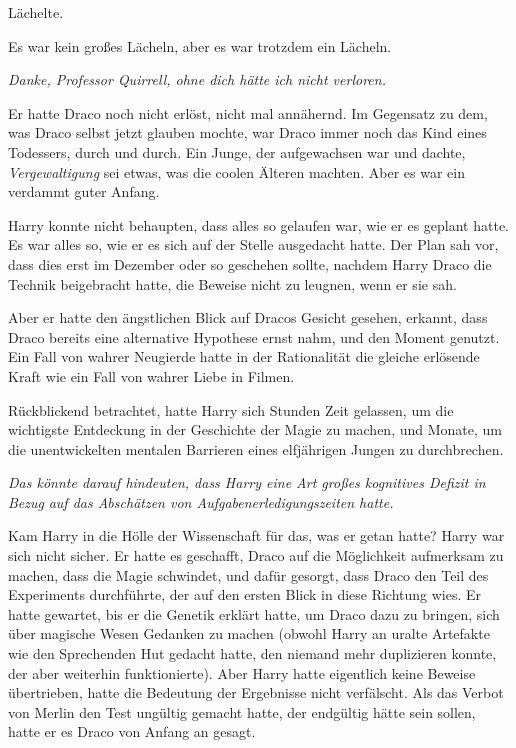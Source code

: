 Lächelte.

Es war kein großes Lächeln, aber es war trotzdem ein Lächeln.

\emph{Danke, Professor Quirrell, ohne dich hätte ich nicht verloren.}

Er hatte Draco noch nicht erlöst, nicht mal annähernd. Im Gegensatz zu dem, was
Draco selbst jetzt glauben mochte, war Draco immer noch das Kind eines
Todessers, durch und durch. Ein Junge, der aufgewachsen war und dachte, \glqq{}
\emph{Vergewaltigung}\grqq{} sei etwas, was die coolen Älteren machten. Aber es
war ein verdammt guter Anfang.

Harry konnte nicht behaupten, dass alles so gelaufen war, wie er es geplant
hatte. Es war alles so, wie er es sich auf der Stelle ausgedacht hatte. Der Plan
sah vor, dass dies erst im Dezember oder so geschehen sollte, nachdem Harry
Draco die Technik beigebracht hatte, die Beweise nicht zu leugnen, wenn er sie
sah.

Aber er hatte den ängstlichen Blick auf Dracos Gesicht gesehen, erkannt, dass
Draco bereits eine alternative Hypothese ernst nahm, und den Moment genutzt. Ein
Fall von wahrer Neugierde hatte in der Rationalität die gleiche erlösende Kraft
wie ein Fall von wahrer Liebe in Filmen.

Rückblickend betrachtet, hatte Harry sich Stunden Zeit gelassen, um die
wichtigste Entdeckung in der Geschichte der Magie zu machen, und Monate, um die
unentwickelten mentalen Barrieren eines elfjährigen Jungen zu durchbrechen.

\emph{Das könnte darauf hindeuten, dass Harry eine Art großes kognitives Defizit
in Bezug} \emph{auf das Abschätzen von Aufgabenerledigungszeiten hatte.}

Kam Harry in die Hölle der Wissenschaft für das, was er getan hatte? Harry war
sich nicht sicher. Er hatte es geschafft, Draco auf die Möglichkeit aufmerksam
zu machen, dass die Magie schwindet, und dafür gesorgt, dass Draco den Teil des
Experiments durchführte, der auf den ersten Blick in diese Richtung wies. Er
hatte gewartet, bis er die Genetik erklärt hatte, um Draco dazu zu bringen, sich
über magische Wesen Gedanken zu machen (obwohl Harry an uralte Artefakte wie den
Sprechenden Hut gedacht hatte, den niemand mehr duplizieren konnte, der aber
weiterhin funktionierte). Aber Harry hatte eigentlich keine Beweise übertrieben,
hatte die Bedeutung der Ergebnisse nicht verfälscht. Als das Verbot von Merlin
den Test ungültig gemacht hatte, der endgültig hätte sein sollen, hatte er es
Draco von Anfang an gesagt.

